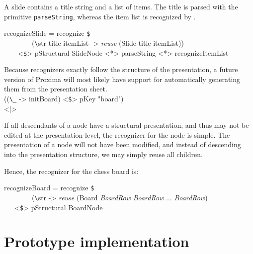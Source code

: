 A slide contains a title string and a list of items.  The title is parsed with the primitive \verb|parseString|, whereas the item list is recognized by .

\ttfamily\begin{small}\begin{tabbing}
recognizeSlide = recognize \verb|$|\\
~~~~~~~~(\verb|\|str title itemList -> {\em reuse} (Slide title itemList))\\
~~~~<\verb|$|> pStructural SlideNode <*> parseString <*> recognizeItemList
\end{tabbing}\end{small}\rmfamily

Because recognizers exactly follow the structure of the presentation, a future version of Proxima will most likely have support for automatically generating them from the presentation sheet. 
\bc \\
      ((\verb|\_| -> initBoard) <\verb|$|> pKey "board")\\
  <|>    \ec
  

If all descendants of a node have a structural presentation, and thus may not be edited at the presentation-level, the recognizer for the node is simple. The presentation of a node will not have been modified, and instead of descending into the presentation structure, we may simply reuse all children.

Hence, the recognizer for the chess board is:

\ttfamily\begin{small}\begin{tabbing}
recognizeBoard = recognize \verb|$|\\
~~~~~~~~(\verb|\|str -> {\em reuse} (Board {\em BoardRow} {\em BoardRow} ... {\em BoardRow})\\
~~~<\verb|$|> pStructural BoardNode\\
\end{tabbing}\end{small}\rmfamily


%																
%																
%																
\section{Prototype implementation} \label{sect:proxImpl}

